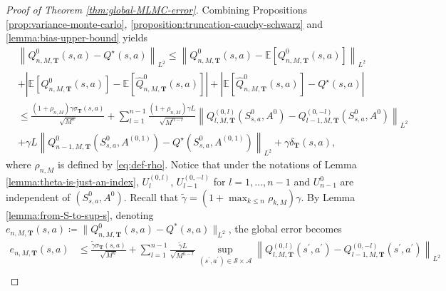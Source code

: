 \documentclass[11pt]{article}
\numberwithin{equation}{section}
\theoremstyle{definition}
\theoremstyle{remark}
\begin{document}
\begin{proof}[Proof of Theorem \ref{thm:global-MLMC-error}]
    Combining Propositions \ref{prop:variance-monte-carlo}, \ref{proposition:truncation-cauchy-schwarz} and \ref{lemma:bias-upper-bound} yields
    \begin{equation*}
        \label{eq:full-error}
        \begin{aligned}
             & \left\| Q ^{0}_{n,M,\mathbf T}(s,a) - Q ^{\star}(s,a) \right\| _{L^2}  \leq \left\| Q ^{0}_{n,M,\mathbf T}(s,a) - \mathbb E \left[ Q ^{0} _{n,M,\mathbf T}(s,a) \right] \right\|_{L^2}                                                                           \\
             & + \left| \mathbb E \left[ Q ^{0}_{n,M,\mathbf T}(s,a) \right] - \mathbb E \left[ \hat{Q} ^{0}_{n,M,\mathbf T} (s,a) \right] \right|
            + \left| \mathbb E \left[ \hat{Q} ^{0}_{n,M,\mathbf T}(s,a) \right]  - Q ^{\star}(s,a) \right|                                                                                                                                                                      \\
             & \leq \frac{(1 + \rho_{n,M})\gamma \sigma_{\mathbf T}(s,a)}{\sqrt{M ^{n}}} + \sum_{l = 1}^{n - 1}\frac{(1 + \rho_{n,M})\gamma L}{\sqrt{M ^{n - l}}}  \left\| Q_{l,M,\mathbf T} ^{(0,l)} \left(S_{s,a}^0,A^{0} \right) - Q_{l-1,M,\mathbf T} ^{(0,-l)} \left(S_{s,a}^0,A^{0}\right)\right\|_{L^2} \\
             & + \gamma L \left\|Q^0_{n-1,M,\mathbf T} \left(S^0_{s,a}, A^{(0,1)}\right) - Q^\star \left(S^0_{s,a}, A^{(0,1)}\right) \right\|_{L^2} + \gamma \delta_{\mathbf T}(s,a),
        \end{aligned}
    \end{equation*}
    where $\rho_{n,M}$ is defined by \eqref{eq:def-rho}.
    Notice that under the notations of Lemma \ref{lemma:theta-is-just-an-index}, $U^{(0,l)}_l$, $U^{(0,-l)}_{l-1}$ for $l =1, \ldots, n-1$ and $U^0_{n-1}$ are independent of $(S_{s,a}^0,A^{0})$. Recall that $\tilde \gamma = (1 + \max_{k \leq n} \rho_{k,M})\gamma$. By Lemma \ref{lemma:from-S-to-sup-s}, denoting $e_{n,M,\mathbf T}(s,a) \coloneqq \| Q ^{0}_{n,M,\mathbf T}(s,a) - Q ^{*}(s,a) \|_{L^2}$, the global error becomes
    \begin{equation*}
        \label{eq:full-error-sup-s}
        \begin{aligned}
            e_{n,M,\mathbf T}(s,a) & \leq \frac{\tilde \gamma \sigma_{\mathbf T}(s,a)}{\sqrt{M ^{n}}} + \sum_{l = 1}^{n - 1}\frac{\tilde \gamma L}{\sqrt{M ^{n - l}}}  \sup_{(s^\prime,a^\prime) \in \mathcal S \times \mathcal A}\left\| Q_{l,M,\mathbf T} ^{(0,l)}(s^\prime,a^\prime) - Q_{l-1,M,\mathbf T} ^{(0,-l)}(s^\prime,a^\prime)\right\|_{L^2} \\

\end{aligned}
\end{equation*}
\end{proof}
\end{document}
